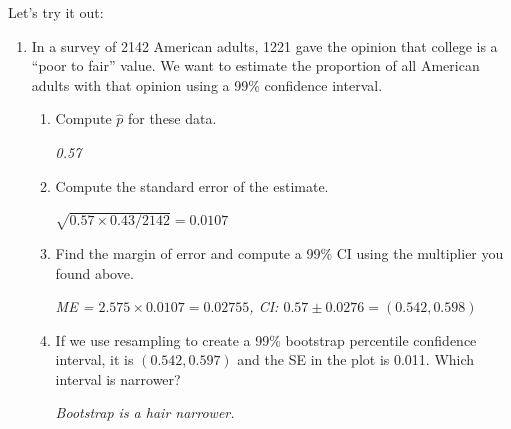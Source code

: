 Let's try it out:  
 \begin{enumerate}
   \item 
     In a survey of  2142 American adults, 1221 gave the opinion that
     college is a ``poor to fair'' value.  We want to estimate the
     proportion of all American adults with that opinion using a 99\%
     confidence interval.  
     \begin{enumerate}
     \item Compute $\widehat{p}$ for these data. 
\begin{students}
        \vspace{1cm}        
\end{students}

\begin{key}
  {\it 0.57 }
\end{key}
     \item \label{propSE} Compute the standard error of the estimate.
\begin{students}
        \vspace{1cm}        
\end{students}

\begin{key}
  {\it $ \sqrt{0.57\times 0.43/2142} = 0.0107$ }
\end{key}

     \item Find the margin of error and compute a 99\% CI using the
       multiplier you found   above.
\begin{students}
        \vspace{1cm}        
\end{students}

\begin{key}
  {\it ME = $ 2.575 \times 0.0107 = 0.02755$, CI: $0.57 \pm  0.0276 = (0.542, 0.598 )$ }
\end{key}

     \item If we use resampling to create a 99\% bootstrap percentile
       confidence interval, it is $(0.542, 0.597)$ and the {\sf SE} in
       the plot is 0.011.  Which interval is narrower? 
\begin{students}
        \vspace{1cm}        
\end{students}

\begin{key}
  {\it Bootstrap is a hair narrower.}
\end{key}


\end{enumerate}
\end{enumerate}
